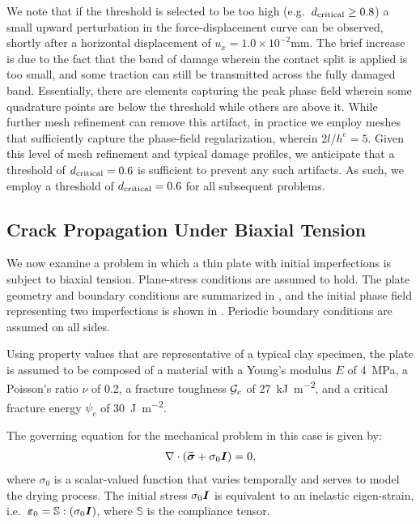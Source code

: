 We note that if the threshold is selected to be too high (e.g.\ $d_{\text{critical}} \ge 0.8$) a small upward perturbation in the force-displacement curve can be observed, shortly after a horizontal displacement of $u_x = 1.0\times 10^{-2}$mm.  The brief increase is due to the fact that the band of damage wherein the contact split is applied is too small, and some traction can still be transmitted across the fully damaged band.  Essentially, there are elements capturing the peak phase field wherein some quadrature points are below the threshold while others are above it.
While further mesh refinement can remove this artifact, in practice we employ meshes that sufficiently capture the phase-field regularization, wherein $ 2 l / h^e = 5$.  Given this level of mesh refinement and typical damage profiles, we anticipate that a threshold of $d_{\text{critical}} = 0.6$ is sufficient to prevent any such artifacts.  As such, we employ a threshold of $d_{\text{critical}} = 0.6$ for all subsequent problems.

\subsection{Crack Propagation Under Biaxial Tension}

We now examine a problem in which a thin plate  with initial imperfections is subject to biaxial tension.  Plane-stress conditions are assumed to hold. The plate geometry and boundary conditions are summarized in , and the initial phase field representing two imperfections is shown in .  Periodic boundary conditions are assumed on all sides.

Using property values that are representative of a typical clay specimen, the plate is assumed to be composed of a material with a Young's modulus $E$ of \SI{4}{\mega\pascal}, a Poisson's ratio $\nu$ of 0.2, a fracture toughness ${\mathcal{G}_c}$ of \SI{27}{\kilo\joule\per\square\meter}, and a critical fracture energy $\psi_c$ of \SI{30}{\joule\per\square\meter}.

The governing equation for the mechanical problem in this case is given by:
\begin{align}
  \label{eq:biaxial}
  \nabla \cdot \left( \widetilde{\boldsymbol{\sigma}} + \sigma_0\boldsymbol{I} \right) = 0 ,
\end{align}
where $\sigma_0$ is a scalar-valued function that varies temporally and serves to model the drying process. The initial stress $\sigma_0\boldsymbol{I}$ is equivalent to an inelastic eigen-strain, i.e.\ $\boldsymbol{\varepsilon}_0 = \mathbb{S}:(\sigma_0\boldsymbol{I})$, where $\mathbb{S}$ is the compliance tensor.

